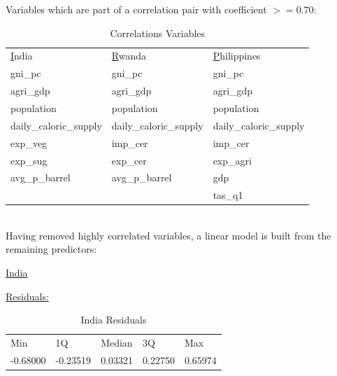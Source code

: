 \documentclass[11pt]{article}
\begin{document}
\newpage
Variables which are part of a correlation pair with coefficient $>= 0.70$:

\FloatBarrier
\begin{table}[!htbp]
\centering
\begin{tabular}{lll}
{\ul India}            & {\ul Rwanda}           & {\ul Philippines}      \\
gni\_pc                & gni\_pc                & gni\_pc                \\
agri\_gdp              & agri\_gdp              & agri\_gdp              \\
population             & population             & population             \\
daily\_caloric\_supply & daily\_caloric\_supply & daily\_caloric\_supply \\
exp\_veg               & imp\_cer               & imp\_cer               \\
exp\_sug               & exp\_cer               & exp\_agri              \\
avg\_p\_barrel         & avg\_p\_barrel         & gdp                    \\
                       &                        & tas\_q1               
\end{tabular}
\caption{Correlations Variables}
\label{table6}
\end{table}
\FloatBarrier

\\
Having removed highly correlated variables, a linear model is built from the remaining predictors:
\begin{center}\underline{India}\\ \end{center}
\underline{Residuals:}
\begin{table}[!htbp]
\centering

\begin{tabular}{lllll}
Min      & 1Q       & Median  & 3Q      & Max     \\
-0.68000 & -0.23519 & 0.03321 & 0.22750 & 0.65974
\end{tabular}
\caption{India Residuals}
\label{table7}
\end{table}
\end{document}
